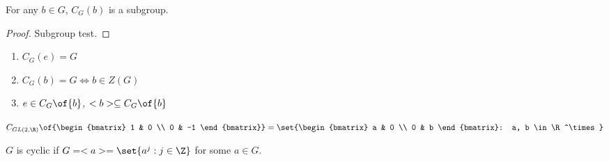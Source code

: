 \begin{theorem}
    For any $b \in G$, $C_G(b)$ is a subgroup.
\end{theorem}
\begin{proof}
    Subgroup test.
\end{proof}

\begin{remark}
    \begin{enumerate}
        \item $C_G(e) = G$
        \item $C_G(b) = G \iff b \in Z(G)$
        \item $e \in C_G\of{b}$, $<b> \subseteq C_G\of{b}$
    \end{enumerate}
\end{remark}

\begin{example}[a centralizer]
    $C_{GL(2, \R)}\of{\begin{bmatrix} 1 & 0 \\ 0 & -1 \end{bmatrix}} = \set{\begin{bmatrix} a & 0 \\ 0 & b \end{bmatrix}: a, b \in \R^\times}$
\end{example}

\begin{recall}
    $G$ is cyclic if $G = <a> = \set{a^j: j \in \Z}$ for some $a \in G$.
\end{recall}

